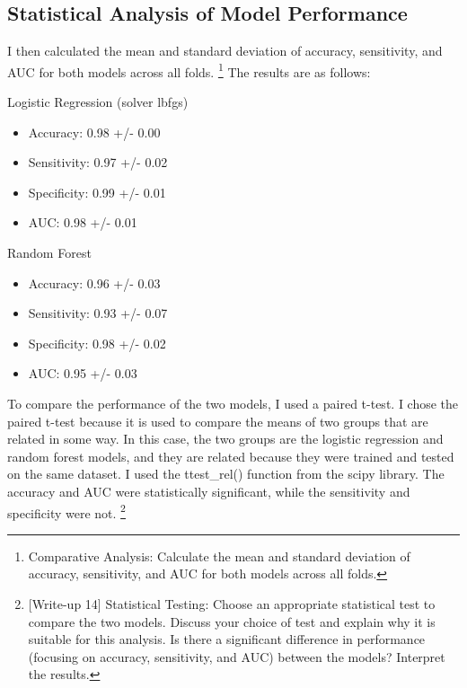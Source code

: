 \documentclass{labReport}
\begin{document}
\begin{multicols*}{2}
    \subsection{Statistical Analysis of Model Performance}
    I then calculated the mean and standard deviation of accuracy, sensitivity, and AUC for both models across all folds. \footnote{Comparative Analysis: Calculate the mean and standard deviation of accuracy, sensitivity, and AUC for both models across all folds.} The results are as follows:

    Logistic Regression (solver lbfgs)
    \begin{itemize}
        \item Accuracy: 0.98 +/- 0.00
        \item Sensitivity: 0.97 +/- 0.02
        \item Specificity: 0.99 +/- 0.01
        \item AUC: 0.98 +/- 0.01
    \end{itemize}

    Random Forest
    \begin{itemize}
        \item Accuracy: 0.96 +/- 0.03
        \item Sensitivity: 0.93 +/- 0.07
        \item Specificity: 0.98 +/- 0.02
        \item AUC: 0.95 +/- 0.03
    \end{itemize}


    To compare the performance of the two models, I used a paired t-test. I chose the paired t-test because it is used to compare the means of two groups that are related in some way. In this case, the two groups are the logistic regression and random forest models, and they are related because they were trained and tested on the same dataset. I used the ttest\_rel() function from the scipy library. The accuracy and AUC were statistically significant, while the sensitivity and specificity were not. \footnote{[Write-up 14] Statistical Testing: Choose an appropriate statistical test to compare the two models. Discuss your choice of test and explain why it is suitable for this analysis. Is there a significant difference in performance (focusing on accuracy, sensitivity, and AUC) between the models? Interpret the results.}



\end{multicols*}
\end{document}
